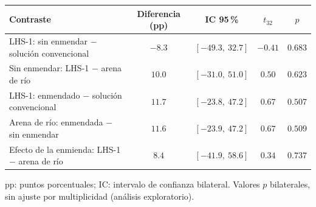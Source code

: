 \begin{tabular}{lcccc}
\hline\hline
\textbf{Contraste} & \textbf{Diferencia (pp)} & \textbf{IC 95\,\%} & \textbf{$t_{32}$} & \textbf{$p$} \\
\hline
LHS-1: sin enmendar $-$ soluci\'on convencional & $-8.3$ & $[-49.3,\ 32.7]$ & $-0.41$ & $0.683$ \\
Sin enmendar: LHS-1 $-$ arena de r\'io & $10.0$ & $[-31.0,\ 51.0]$ & $0.50$ & $0.623$ \\
LHS-1: enmendado $-$ soluci\'on convencional & $11.7$ & $[-23.8,\ 47.2]$ & $0.67$ & $0.507$ \\
Arena de r\'io: enmendada $-$ sin enmendar & $11.6$ & $[-23.9,\ 47.2]$ & $0.67$ & $0.509$ \\
Efecto de la enmienda: LHS-1 $-$ arena de r\'io & $8.4$ & $[-41.9,\ 58.6]$ & $0.34$ & $0.737$ \\
\hline
\end{tabular}
\par\vspace{4pt}
\parbox{0.94\linewidth}{\footnotesize pp: puntos porcentuales; IC: intervalo de confianza bilateral. Valores $p$ bilaterales, sin ajuste por multiplicidad (an\'alisis exploratorio).}
